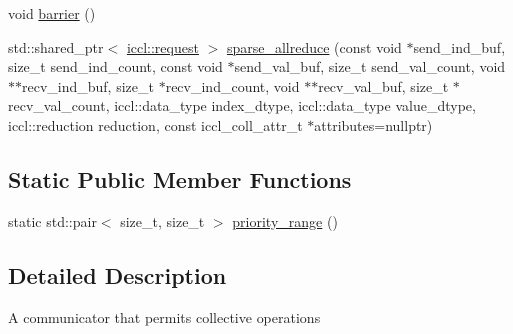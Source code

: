 \begin{DoxyCompactItemize}
\item 
void \hyperlink{classiccl_1_1communicator_ac5b29b589751640bff11460110c09db4}{barrier} ()
\item 
std\-::shared\-\_\-ptr$<$ \hyperlink{classiccl_1_1request}{iccl\-::request} $>$ \hyperlink{classiccl_1_1communicator_a5d352eb424afeb470d0f5a5a001420ab}{sparse\-\_\-allreduce} (const void $\ast$send\-\_\-ind\-\_\-buf, size\-\_\-t send\-\_\-ind\-\_\-count, const void $\ast$send\-\_\-val\-\_\-buf, size\-\_\-t send\-\_\-val\-\_\-count, void $\ast$$\ast$recv\-\_\-ind\-\_\-buf, size\-\_\-t $\ast$recv\-\_\-ind\-\_\-count, void $\ast$$\ast$recv\-\_\-val\-\_\-buf, size\-\_\-t $\ast$recv\-\_\-val\-\_\-count, iccl\-::data\-\_\-type index\-\_\-dtype, iccl\-::data\-\_\-type value\-\_\-dtype, iccl\-::reduction reduction, const iccl\-\_\-coll\-\_\-attr\-\_\-t $\ast$attributes=nullptr)
\end{DoxyCompactItemize}
\subsection*{Static Public Member Functions}
\begin{DoxyCompactItemize}
\item 
static std\-::pair$<$ size\-\_\-t, size\-\_\-t $>$ \hyperlink{classiccl_1_1communicator_ad631243cbec6015231b2472bd09d5f5c}{priority\-\_\-range} ()
\end{DoxyCompactItemize}


\subsection{Detailed Description}
A communicator that permits collective operations 

